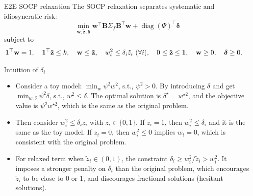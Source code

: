 \documentclass[10pt,aspectratio=169]{beamer}
\newcommand{\Kcard}{k}
\newcommand{\SigmaMat}{\Sigma}
\newcommand{\diagv}{\operatorname{diag}}
\begin{document}
\begin{frame}{E2E SOCP relaxation}
  \small
  The SOCP relaxation separates systematic and idiosyncratic risk:
  \[
    \min_{\mathbf{w},\tilde{\mathbf z},\boldsymbol{\delta}}
    \mathbf{w}^\top \mathbf{B}\SigmaMat_f \mathbf{B}^\top \mathbf{w}
    + \diagv(\Psi)^\top\boldsymbol{\delta}
  \]
  subject to
  \[
  \begin{aligned}
    &\one^\top \mathbf{w}=1,\quad
      \one^\top \tilde{\mathbf z}\le \Kcard,\quad
      \mathbf{w}\le \tilde{\mathbf z},\quad
      w_i^2 \le \delta_i \tilde z_i ~(\forall i),  \quad 0\le\tilde{\mathbf z}\le\one,\quad
      \mathbf{w}\ge0,\quad
      \boldsymbol{\delta}\ge0.
  \end{aligned}
  \]

\begin{block}{\small Intuition of $\delta_i$}
  \footnotesize
  \begin{itemize}
    \item Consider a toy model: $\min_w \psi^2 w^2$, s.t., $\psi^2 > 0$. By introducing $\delta$ and get $\min_{w,\delta} \psi^2 \delta$, s.t., $w^2 \le \delta$. The optimal solution is $\delta^\star = w^{\star 2}$, and the objective value is $\psi^2 w^{\star 2}$, which is the same as the original problem.
    \item Then consider $w_i^2 \le \delta_i z_i$ with $z_i \in \{0,1\}$. If $z_i=1$, then $w_i^2 \le \delta_i$ and it is the same as the toy model. If $z_i=0$, then $w_i^2 \le 0$ implies $w_i=0$, which is consistent with the original problem.
    \item For relaxed term when $\tilde z_i \in (0,1)$, the constraint $\delta_i \geq w_i^2/\tilde z_i > w_i^2$. It imposes a stronger penalty on $\delta_i$ than the original problem, which encourages $\tilde z_i$ to be close to 0 or 1, and discourages fractional solutions (hesitant solutions).
  \end{itemize}
\end{block}
\end{frame}
\end{document}
